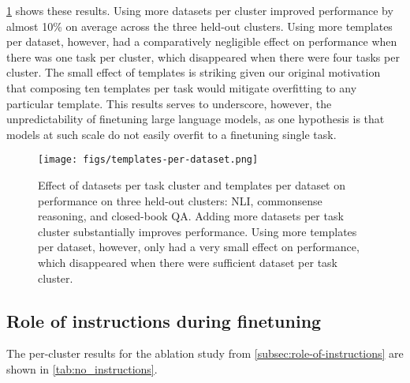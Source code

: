 \documentclass{article} \usepackage{iclr2022_conference,times}
\begin{document}
\cref{fig:ablation-templates} shows these results.
Using more datasets per cluster improved performance by almost 10\% on average across the three held-out clusters. 
Using more templates per dataset, however, had a comparatively negligible effect on performance when there was one task per cluster, which disappeared when there were four tasks per cluster.
The small effect of templates is striking given our original motivation that composing ten templates per task would mitigate overfitting to any particular template. 
This results serves to underscore, however, the unpredictability of finetuning large language models, as one hypothesis is that models at such scale do not easily overfit to a finetuning single task.

\begin{figure}[h]
    \centering
    \texttt{[image: figs/templates-per-dataset.png]}
    \vspace{-2mm}
    \caption{Effect of datasets per task cluster and templates per dataset on performance on three held-out clusters: NLI, commonsense reasoning, and closed-book QA.
    Adding more datasets per task cluster substantially improves performance.
    Using more templates per dataset, however, only had a very small effect on performance, which disappeared when there were sufficient dataset per task cluster.
    }
    \label{fig:ablation-templates}
\end{figure}

\subsection{Role of instructions during finetuning}\label{subsec:role_instructions}
The per-cluster results for the ablation study from \cref{subsec:role-of-instructions} are shown in \cref{tab:no_instructions}.
\end{document}
